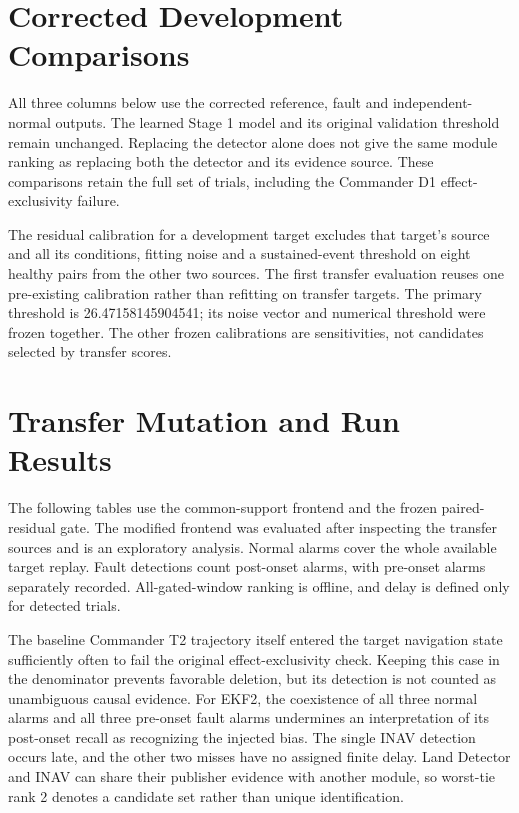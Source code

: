\documentclass[10pt,a4paper]{article}
\begin{document}
\section{Corrected Development Comparisons}

All three columns below use the corrected reference, fault and independent-normal outputs. The learned Stage 1 model and its original validation threshold remain unchanged. Replacing the detector alone does not give the same module ranking as replacing both the detector and its evidence source. These comparisons retain the full set of trials, including the Commander D1 effect-exclusivity failure.


The residual calibration for a development target excludes that target's source and all its conditions, fitting noise and a sustained-event threshold on eight healthy pairs from the other two sources. The first transfer evaluation reuses one pre-existing calibration rather than refitting on transfer targets. The primary threshold is 26.47158145904541; its noise vector and numerical threshold were frozen together. The other frozen calibrations are sensitivities, not candidates selected by transfer scores.

\FloatBarrier

\section{Transfer Mutation and Run Results}

The following tables use the common-support frontend and the frozen paired-residual gate. The modified frontend was evaluated after inspecting the transfer sources and is an exploratory analysis. Normal alarms cover the whole available target replay. Fault detections count post-onset alarms, with pre-onset alarms separately recorded. All-gated-window ranking is offline, and delay is defined only for detected trials.



The baseline Commander T2 trajectory itself entered the target navigation state sufficiently often to fail the original effect-exclusivity check. Keeping this case in the denominator prevents favorable deletion, but its detection is not counted as unambiguous causal evidence. For EKF2, the coexistence of all three normal alarms and all three pre-onset fault alarms undermines an interpretation of its post-onset recall as recognizing the injected bias. The single INAV detection occurs late, and the other two misses have no assigned finite delay. Land Detector and INAV can share their publisher evidence with another module, so worst-tie rank 2 denotes a candidate set rather than unique identification.
\FloatBarrier
\end{document}
